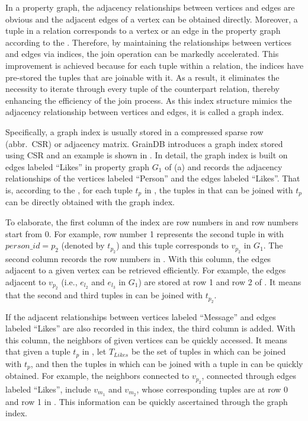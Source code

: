 In a property graph, the adjacency relationships between vertices and edges are obvious and the adjacent edges of a vertex can be obtained directly.
Moreover, a tuple in a relation corresponds to a vertex or an edge in the property graph according to the \rgmapping.
Therefore, by maintaining the relationships between vertices and edges via indices, the join operation can be markedly accelerated. 
This improvement is achieved because for each tuple within a relation, the indices have pre-stored the tuples that are joinable with it. 
As a result, it eliminates the necessity to iterate through every tuple of the counterpart relation, thereby enhancing the efficiency of the join process.
As this index structure mimics the adjacency relationship between vertices and edges, it is called a graph index.


Specifically, a graph index is usually stored in a compressed sparse row (abbr.~CSR) \cite{} or adjacency matrix.
GrainDB \cite{graindb} introduces a graph index stored using CSR and an example is shown in .
In detail, the graph index is built on edges labeled ``Likes'' in property graph $G_1$ of (a) and records the adjacency relationships of the vertices labeled ``Person'' and the edges labeled ``Likes''.
That is, according to the \rgmapping, for each tuple $t_p$ in , the tuples in  that can be joined with $t_p$ can be directly obtained with the graph index.

To elaborate, the first column of the index are row numbers in  and row numbers start from 0.
For example, row number 1 represents the second tuple in  with $person\_id = p_2$ (denoted by $t_{p_2}$) and this tuple corresponds to $v_{p_2}$ in $G_1$.
The second column records the row numbers in .
With this column, the edges adjacent to a given vertex can be retrieved efficiently.
For example, the edges adjacent to $v_{p_2}$ (i.e., $e_{l_2}$ and $e_{l_3}$ in $G_1$) are stored at row 1 and row 2 of .
It means that the second and third tuples in  can be joined with $t_{p_2}$.

If the adjacent relationships between vertices labeled ``Message'' and edges labeled ``Likes'' are also recorded in this index, the third column is added.
With this column, the neighbors of given vertices can be quickly accessed.
It means that given a tuple $t_p$ in , let $T_{Likes}$ be the set of tuples in  which can be joined with $t_p$, and then the tuples in  which can be joined with a tuple in  can be quickly obtained.
For example, the neighbors connected to $v_{p_2}$, connected through edges labeled ``Likes'', include $v_{m_1}$ and $v_{m_2}$, whose corresponding tuples are at row 0 and row 1 in .
This information can be quickly ascertained through the graph index.



